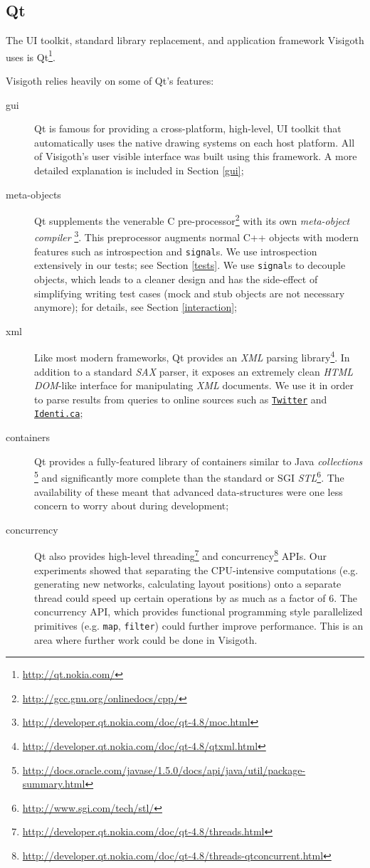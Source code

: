 \documentclass[a4paper,11pt,titlepage]{article}
\let\stdhref\href
\renewcommand{\href}[2]{\stdhref{#1}{\texttt{#2}}}
\newcommand{\code}[1]{\texttt{#1}}
\newcommand{\buzz}[1]{\emph{#1}}
\begin{document}
\subsection{Qt}

The UI toolkit, standard library replacement, and application
framework Visigoth uses is Qt\footnote{\url{http://qt.nokia.com/}}.

Visigoth relies heavily on some of Qt's features:
\begin{description}
\item [gui] Qt is famous for providing a cross-platform, high-level,
  UI toolkit that automatically uses the native drawing systems on
  each host platform. All of Visigoth's user visible interface was
  built using this framework. A more detailed explanation is included
  in Section \ref{gui};
\item [meta-objects] Qt supplements the venerable C
  pre-processor\footnote{\url{http://gcc.gnu.org/onlinedocs/cpp/}}
  with its own \buzz{meta-object
    compiler} \footnote{\url{http://developer.qt.nokia.com/doc/qt-4.8/moc.html}}.
  This preprocessor augments normal C++ objects with modern features
  such as introspection and \code{signal}s. We use introspection
  extensively in our tests; see Section \ref{tests}. We use
  \code{signal}s to decouple objects, which leads to a cleaner design
  and has the side-effect of simplifying writing test cases (mock and
  stub objects are not necessary anymore); for details, see Section
  \ref{interaction};
\item [xml] Like most modern frameworks, Qt provides an \buzz{XML}
  parsing
  library\footnote{\url{http://developer.qt.nokia.com/doc/qt-4.8/qtxml.html}}.
  In addition to a standard \buzz{SAX} parser, it exposes an extremely
  clean \buzz{HTML DOM}-like interface for manipulating \buzz{XML}
  documents. We use it in order to parse results from queries to
  online sources such as \href{http://twitter.com}{Twitter} and
  \href{http://identi.ca}{Identi.ca};
\item [containers] Qt provides a fully-featured library of containers
  similar to Java
  \buzz{collections} \footnote{\url{http://docs.oracle.com/javase/1.5.0/docs/api/java/util/package-summary.html}}
  and significantly more complete than the standard or SGI
  \buzz{STL}\footnote{\url{http://www.sgi.com/tech/stl/}}. The
  availability of these meant that advanced data-structures were one
  less concern to worry about during development;
\item [concurrency] Qt also provides high-level
  threading\footnote{\url{http://developer.qt.nokia.com/doc/qt-4.8/threads.html}}
  and
  concurrency\footnote{\url{http://developer.qt.nokia.com/doc/qt-4.8/threads-qtconcurrent.html}}
  APIs. Our experiments showed that separating the CPU-intensive
  computations (e.g. generating new networks, calculating layout
  positions) onto a separate thread could speed up certain operations
  by as much as a factor of $6$. The concurrency API, which provides
  functional programming style parallelized primitives
  (e.g. \code{map}, \code{filter}) could further improve performance.
  This is an area where further work could be done in Visigoth.
\end{description}
\end{document}
